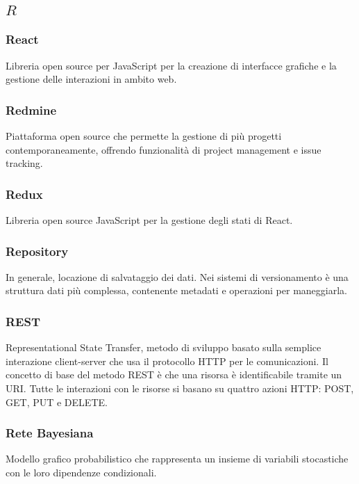 \subsection*{\quad$R\quad$}

\subsubsection*{React}
Libreria open source per JavaScript per la creazione di interfacce grafiche e la gestione delle interazioni in ambito web.

\subsubsection*{Redmine}
Piattaforma open source che permette la gestione di più progetti contemporaneamente, offrendo funzionalità di project management e issue tracking.

\subsubsection*{Redux}
Libreria open source JavaScript per la gestione degli stati di React\glo.

\subsubsection*{Repository}
In generale, locazione di salvataggio dei dati. Nei sistemi di versionamento è una struttura dati più complessa, contenente metadati e operazioni per maneggiarla.

\subsubsection*{REST}
Representational State Transfer, metodo di sviluppo basato sulla semplice interazione client-server che usa il protocollo HTTP per le comunicazioni. Il concetto di base del metodo REST è che una risorsa è  identificabile tramite un URI. Tutte le interazioni con le risorse si basano su quattro azioni HTTP: POST, GET, PUT e DELETE.

\subsubsection*{Rete Bayesiana}
Modello grafico probabilistico che rappresenta un insieme di variabili stocastiche con le loro dipendenze condizionali.

